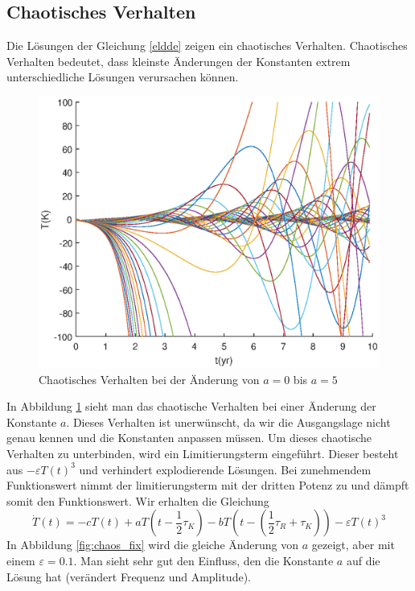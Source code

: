 \subsection{Chaotisches Verhalten}
Die Lösungen der Gleichung \eqref{eldde} zeigen ein chaotisches Verhalten.
Chaotisches Verhalten bedeutet, dass kleinste Änderungen der Konstanten extrem unterschiedliche Lösungen verursachen können. 
\begin{figure}
	\centering
	\includegraphics{verzoegert/inp/figures/param_a_e0.eps}
	\caption{Chaotisches Verhalten bei der Änderung von $a=0$ bis $a=5$}
	\label{fig:chaos}
\end{figure}
In Abbildung \ref{fig:chaos} sieht man das chaotische Verhalten bei einer Änderung der Konstante $a$.
Dieses Verhalten ist unerwünscht, da wir die Ausgangslage nicht genau kennen und die Konstanten anpassen müssen.
Um dieses chaotische Verhalten zu unterbinden, wird ein Limitierungsterm eingeführt.
Dieser besteht aus $-\varepsilon T(t)^3$ und verhindert explodierende Lösungen.
Bei zunehmendem Funktionswert nimmt der limitierungsterm mit der dritten Potenz zu und dämpft somit den Funktionswert.
Wir erhalten die Gleichung
\begin{equation} \label{eldde_epsilon}
\dot{T}(t)=-cT(t)+aT(t-\frac{1}{2}\tau_K)-bT(t-(\frac{1}{2}\tau_R+\tau_K))-\varepsilon T(t)^3
\end{equation}
In Abbildung \ref{fig:chaos_fix} wird die gleiche Änderung von $a$ gezeigt, aber mit einem $\varepsilon = 0.1$.
Man sieht sehr gut den Einfluss, den die Konstante $a$ auf die Lösung hat (verändert Frequenz und Amplitude).
